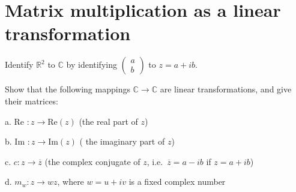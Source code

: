 \newpage

\setcounter{section}{2} 
\section{Matrix multiplication as a linear transformation}

\begin{exercise}{20}
    Identify $\mathbb{R}^2$ to $\mathbb{C}$ by identifying $\begin{pmatrix}
        a \\ b
    \end{pmatrix}$ to $z = a + ib$.

    Show that the following mappings $\mathbb{C} \rightarrow \mathbb{C}$ are linear transformations, and give their matrices:

    a. Re $: z \rightarrow \text{Re}(z)$ (the real part of $z$)

    b. Im $: z \rightarrow \text{Im}(z)$ ( the imaginary part of $z$)

    c. $c: z \rightarrow \overline{z}$ (the complex conjugate of $z$, i.e.\ $\overline{z} = a - ib$ if $z = a +ib$)

    d. $m_w : z \rightarrow wz$, where $w = u + iv$ is a fixed complex number
\end{exercise}


